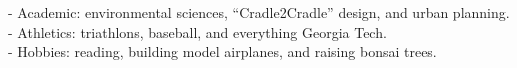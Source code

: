 \documentclass[11pt]{cv}
\begin{document}
\begin{llist}

- Academic: environmental sciences, ``Cradle2Cradle'' design, and urban planning.\\
- Athletics: triathlons, baseball, and everything Georgia Tech.\\
- Hobbies: reading, building model airplanes, and raising bonsai trees.\\

\end{llist}
\end{document}
